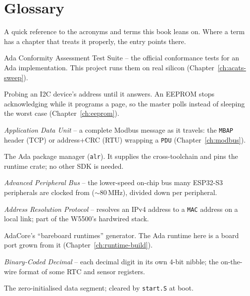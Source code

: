 \chapter{Glossary}
\label{ch:glossary}

A quick reference to the acronyms and terms this book leans on. Where a term has
a chapter that treats it properly, the entry points there.

\begin{description}[style=nextline, leftmargin=0pt]

\item[ACATS] Ada Conformity Assessment Test Suite -- the official conformance
  tests for an Ada implementation. This project runs them on real silicon
  (Chapter~\ref{ch:acats-sweep}).

\item[ACK polling] Probing an I2C device's address until it answers. An EEPROM stops acknowledging while it programs a page, so the master polls instead of sleeping the worst case (Chapter~\ref{ch:eeprom}).

\item[ADU] \emph{Application Data Unit} -- a complete Modbus message as it travels: the \texttt{MBAP} header (TCP) or address+CRC (RTU) wrapping a \texttt{PDU} (Chapter~\ref{ch:modbus}).

\item[Alire] The Ada package manager (\texttt{alr}). It supplies the
  cross-toolchain and pins the runtime crate; no other SDK is needed.

\item[APB] \emph{Advanced Peripheral Bus} -- the lower-speed on-chip bus many ESP32-S3 peripherals are clocked from ($\sim$80\,MHz), divided down per peripheral.

\item[ARP] \emph{Address Resolution Protocol} -- resolves an IPv4 address to a \texttt{MAC} address on a local link; part of the W5500's hardwired stack.

\item[\texttt{bb-runtimes}] AdaCore's ``bareboard runtimes'' generator. The Ada
  runtime here is a board port grown from it (Chapter~\ref{ch:runtime-build}).

\item[BCD] \emph{Binary-Coded Decimal} -- each decimal digit in its own 4-bit nibble; the on-the-wire format of some RTC and sensor registers.

\item[\texttt{.bss}] The zero-initialised data segment; cleared by \texttt{start.S}
  at boot.


\end{description}
